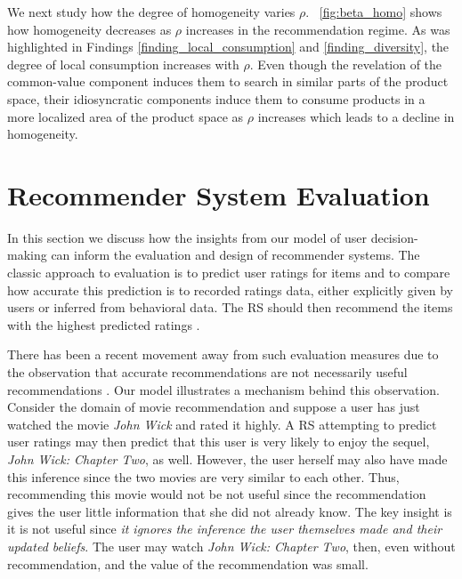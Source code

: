 \documentclass[manuscript]{acmart}
\begin{document}
We next study how the degree of homogeneity varies  $\rho$. ~\autoref{fig:beta_homo} shows how homogeneity decreases as $\rho$ increases in the recommendation regime. As was highlighted in Findings \ref{finding_local_consumption} and \ref{finding_diversity}, the degree of local consumption increases with $\rho$. Even though the revelation of the common-value component induces them to search in similar parts of the product space, their idiosyncratic components induce them to consume products in a more localized area of the product space as $\rho$ increases which leads to a decline in homogeneity.

\section{Recommender System Evaluation}
In this section we discuss how the insights from our model of user decision-making can inform the evaluation and design of recommender systems. The classic approach to evaluation is to predict user ratings for items and to compare how accurate this prediction is to recorded ratings data, either explicitly given by users or inferred from behavioral data. The RS should then recommend the items with the highest predicted ratings \cite{adomavicius2005toward}.
\par
There has been a recent movement away from such evaluation measures due to the observation that accurate recommendations are not necessarily useful recommendations \cite{mcnee2006being}. Our model illustrates a mechanism behind this observation. Consider the domain of movie recommendation and suppose a user has just watched the movie \textit{John Wick} and rated it highly. A RS attempting to predict user ratings may then predict that this user is very likely to enjoy the sequel, \textit{John Wick: Chapter Two}, as well. However, the user herself may also have made this inference since the two movies are very similar to each other. Thus, recommending this movie would not be not useful since the recommendation gives the user little information that she did not already know. The key insight is it is not useful since \textit{it ignores the inference the user themselves made and their updated beliefs}. The user may watch \textit{John Wick: Chapter Two}, then, even without recommendation, and the value of the recommendation was small.
\par
\end{document}
